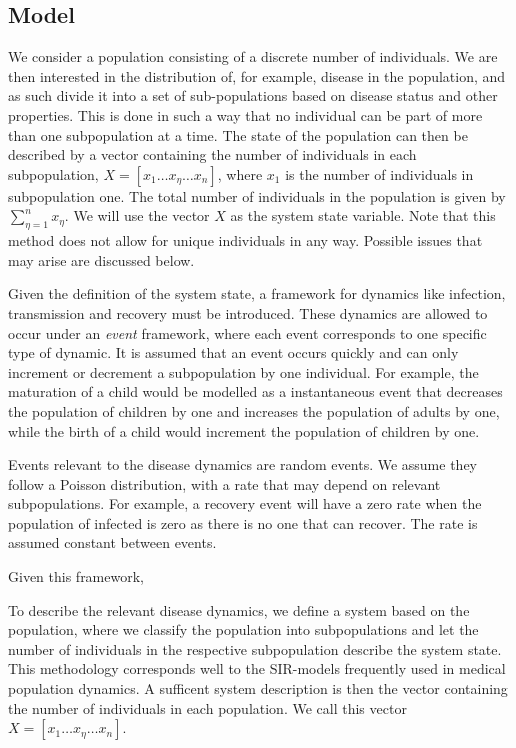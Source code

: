 \documentclass[10pt,a4paper]{article}
\begin{document}

\subsection{Model}

We consider a population consisting of a discrete number of individuals. We are then interested in the distribution of, for example, disease in the population, and as such divide it into a set of sub-populations based on disease status and other properties. This is done in such a way that no individual can be part of more than one subpopulation at a time. The state of the population can then be described by a vector containing the number of individuals in each subpopulation, $X = \left[ x_1 \ldots x_\eta \ldots x_n\right]$, where $x_1$ is the number of individuals in subpopulation one. The total number of individuals in the population is given by $\sum_{\eta = 1}^n x_{\eta}$. We will use the vector $X$ as the system state variable.
Note that this method does not allow for unique individuals in any way. Possible issues that may arise are discussed below.

Given the definition of the system state, a framework for dynamics like infection, transmission and recovery must be introduced. These dynamics are allowed to occur under an \emph{event} framework, where each event corresponds to one specific type of dynamic. It is assumed that an event occurs quickly and can only increment or decrement a subpopulation by one individual. For example, the maturation of a child would be modelled as a instantaneous event that decreases the population of children by one and increases the population of adults by one, while the birth of a child would increment the population of children by one.

Events relevant to the disease dynamics are random events. We assume they follow a Poisson distribution, with a rate that may depend on relevant subpopulations. For example, a recovery event will have a zero rate when the population of infected is zero as there is no one that can recover. The rate is assumed constant between events.

Given this framework, 

To describe the relevant disease dynamics, we define a system based on the population, where we classify the population into subpopulations and let the number of individuals in the respective subpopulation describe the system state. This methodology corresponds well to the SIR-models frequently used in medical population dynamics. A sufficent system description is then the vector containing the number of individuals in each population. We call this vector $X = \left[ x_1 \ldots x_\eta \ldots x_n \right]$. 
\end{document}
